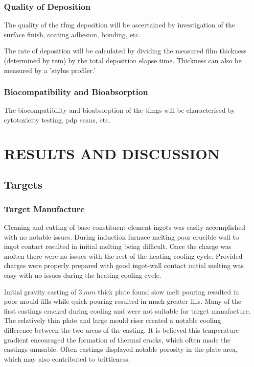 \documentclass[a4paper,12pt,oneside]{report}%
\begin{document}
\subsection{Quality of Deposition} 
The quality of the \gls{tfmg} deposition will be ascertained by investigation of the surface finish, coating adhesion, bonding, etc.

The rate of deposition will be calculated by dividing the measured film thickness (determined by \acrshort{tem}) by the total deposition elapse time. Thickness can also be measured by a 'stylus profiler.'

\subsection{Biocompatibility and Bioabsorption} 
The biocompatibility and bioabsorption of the \glspl{tfmg} will be characterised by cytotoxicity testing, \acrshort{pdp} scans, etc. 


\chapter{RESULTS AND DISCUSSION}
\glsresetall

\section{Targets}
\subsection{Target Manufacture}
Cleaning and cutting of base constituent element ingots was easily accomplished with no notable issues. During induction furnace melting poor crucible wall to ingot contact resulted in initial melting being difficult. Once the charge was molten there were no issues with the rest of the heating-cooling cycle. Provided charges were properly prepared with good ingot-wall contact initial melting was easy with no issues during the heating-cooling cycle. 

Initial gravity casting of $3~ mm$ thick plate found slow melt pouring resulted in poor mould fills while quick pouring resulted in much greater fills. Many of the first castings cracked during cooling and were not suitable for target manufacture. The relatively thin plate and large mould riser created a notable cooling difference between the two areas of the casting. It is believed this temperature gradient encouraged the formation of thermal cracks, which often made the castings unusable. Often castings displayed notable porosity in the plate area, which may also contributed to brittleness. 
\end{document}
